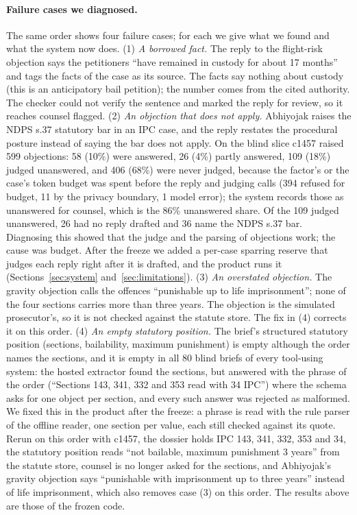 \paragraph{Failure cases we diagnosed.} The same order shows four failure cases; for each we give what we found and what the system now does.
(1) \emph{A borrowed fact.} The reply to the flight-risk objection says the petitioners ``have remained in custody for about 17 months'' and tags the facts of the case as its source. The facts say nothing about custody (this is an anticipatory bail petition); the number comes from the cited authority. The checker could not verify the sentence and marked the reply for review, so it reaches counsel flagged.
(2) \emph{An objection that does not apply.} Abhiyojak raises the NDPS s.37 statutory bar in an IPC case, and the reply restates the procedural posture instead of saying the bar does not apply. On the blind slice c1457 raised 599 objections: 58 (10\%) were answered, 26 (4\%) partly answered, 109 (18\%) judged unanswered, and 406 (68\%) were never judged, because the factor's or the case's token budget was spent before the reply and judging calls (394 refused for budget, 11 by the privacy boundary, 1 model error); the system records those as unanswered for counsel, which is the 86\% unanswered share. Of the 109 judged unanswered, 26 had no reply drafted and 36 name the NDPS s.37 bar. Diagnosing this showed that the judge and the parsing of objections work; the cause was budget. After the freeze we added a per-case sparring reserve that judges each reply right after it is drafted, and the product runs it (Sections~\ref{sec:system} and~\ref{sec:limitations}).
(3) \emph{An overstated objection.} The gravity objection calls the offences ``punishable up to life imprisonment''; none of the four sections carries more than three years. The objection is the simulated prosecutor's, so it is not checked against the statute store. The fix in (4) corrects it on this order.
(4) \emph{An empty statutory position.} The brief's structured statutory position (sections, bailability, maximum punishment) is empty although the order names the sections, and it is empty in all 80 blind briefs of every tool-using system: the hosted extractor found the sections, but answered with the phrase of the order (``Sections 143, 341, 332 and 353 read with 34 IPC'') where the schema asks for one object per section, and every such answer was rejected as malformed. We fixed this in the product after the freeze: a phrase is read with the rule parser of the offline reader, one section per value, each still checked against its quote. Rerun on this order with c1457, the dossier holds IPC 143, 341, 332, 353 and 34, the statutory position reads ``not bailable, maximum punishment 3 years'' from the statute store, counsel is no longer asked for the sections, and Abhiyojak's gravity objection says ``punishable with imprisonment up to three years'' instead of life imprisonment, which also removes case (3) on this order. The results above are those of the frozen code.
